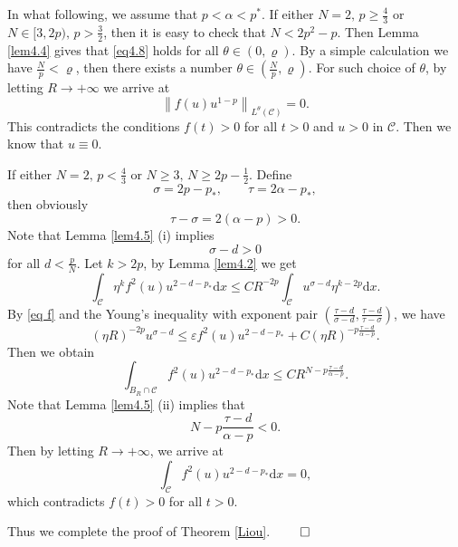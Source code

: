 \documentclass[12pt]{amsart}
\theoremstyle{definition}
\theoremstyle{remark}
\theoremstyle{conclusion}
\theoremstyle{conjecture}
\numberwithin{equation}{section}
\begin{document}
In what following, we assume that $p<\alpha<p^*$. If either $N=2,\,p\geq\frac{4}{3}$ or $N\in[3,2p),\,p>\frac{3}{2}$, then it is easy to check that $N<2p^2-p$. Then Lemma \ref{lem4.4} gives that \eqref{eq4.8} holds for
all $\theta\in(0,\varrho)$. By a simple calculation we have $\frac{N}{p}<\varrho$, then there exists a number $\theta\in(\frac{N}{p},\varrho)$. For such choice of $\theta$, by letting $R\rightarrow+\infty$ we arrive at
$$\left\lVert f(u)u^{1-p}\right\rVert _{L^{\theta}(\mathcal{C})}=0.$$
This contradicts the conditions $f(t)>0$ for all $t>0$ and $u>0$ in $\mathcal{C}$. Then we know that $u\equiv0$.

If either $N=2,\,p<\frac{4}{3}$ or $N\geq3,\,N\geq 2p-\frac{1}{2}$. Define
$$\sigma=2p-p_*,\qquad\tau=2\alpha-p_*,$$
then obviously
$$\tau-\sigma=2(\alpha-p)>0.$$
Note that Lemma \ref{lem4.5} (i) implies
$$\sigma-d>0$$
for all $d<\frac{p}{N}$. Let $k>2p$, by Lemma \ref{lem4.2} we get
$$ \int_{\mathcal{C}}\eta^kf^2(u)u^{2-d-p_*}\mathrm{d}x\leq CR^{-2p}\int_{\mathcal{C}}u^{\sigma-d}\eta^{k-2p}\mathrm{d}x.$$
By \eqref{eq f} and the Young's inequality with exponent pair $(\frac{\tau-d}{\sigma-d},\frac{\tau-d}{\tau-\sigma})$, we have
$$(\eta R)^{-2p}u^{\sigma-d}\leq \varepsilon f^2(u)u^{2-d-p_*}+C(\eta R)^{-p\frac{\tau-d}{\alpha-p}}.$$
Then we obtain
$$\int_{B_R\cap\mathcal{C}}f^2(u)u^{2-d-p_*}\mathrm{d}x\leq CR^{N-p\frac{\tau-d}{\alpha-p}}.$$
Note that Lemma \ref{lem4.5} (ii) implies that
$$N-p\frac{\tau-d}{\alpha-p}<0.$$
Then by letting $R\rightarrow+\infty$, we arrive at
$$\int_{\mathcal{C}}f^2(u)u^{2-d-p_*}\mathrm{d}x=0,$$
which contradicts $f(t)>0$ for all $t>0$.

Thus we complete the proof of Theorem \ref{Liou}.  \qquad\qquad\qquad\quad$\qed$


\smallskip
\end{document}
